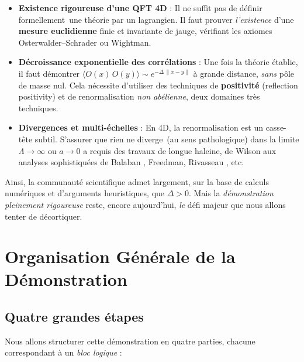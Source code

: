 \begin{itemize}
	\item \textbf{Existence rigoureuse d’une QFT 4D} : 
	Il ne suffit pas de \og définir formellement\fg\ une théorie par un lagrangien. Il faut prouver \emph{l’existence} d’une \textbf{mesure euclidienne} finie et invariante de jauge, vérifiant les axiomes Osterwalder--Schrader ou Wightman. 
	\item \textbf{Décroissance exponentielle des corrélations} :
	Une fois la théorie établie, il faut démontrer \(\langle O(x)\,O(y)\rangle \sim e^{-\Delta\,\|x-y\|}\) à grande distance, \emph{sans} pôle de masse nul. Cela nécessite d’utiliser des techniques de \textbf{positivité} (reflection positivity) et de renormalisation \emph{non abélienne}, deux domaines très techniques.
	\item \textbf{Divergences et multi-échelles} :
	En 4D, la renormalisation est un casse-tête subtil. S’assurer que \og rien ne diverge\fg\ (au sens pathologique) dans la limite \(\Lambda \to \infty\) ou \(a \to 0\) a requis des travaux de longue haleine, de Wilson \cite{Wilson1974} aux analyses sophistiquées de Balaban \cite{Balaban1982-1,Balaban1982-2}, Freedman, Rivasseau \cite{Rivasseau1991}, etc.
\end{itemize}

Ainsi, la communauté scientifique admet largement, sur la base de calculs numériques et d’arguments heuristiques, que \(\Delta > 0\). Mais la \textit{démonstration pleinement rigoureuse} reste, encore aujourd’hui, \emph{le} défi majeur que nous allons tenter de décortiquer.

\section{Organisation Générale de la Démonstration}
\label{sec:1.4}

\subsection*{Quatre grandes étapes}

Nous allons structurer cette démonstration en quatre parties, chacune correspondant à un \emph{bloc logique} :

